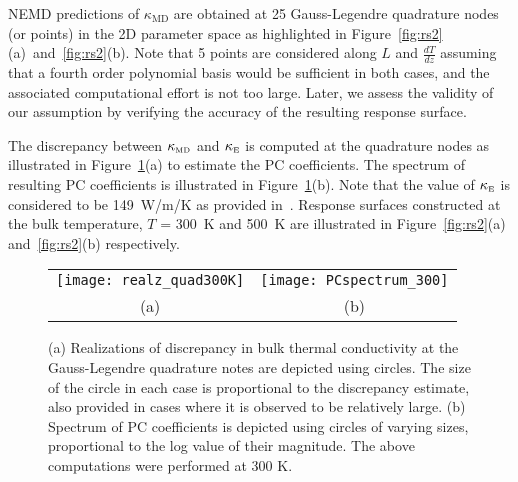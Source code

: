 NEMD predictions of $\kappa_{\text{MD}}$
are obtained at 25 Gauss-Legendre quadrature nodes (or points) in the 2D parameter 
space as highlighted in Figure~\ref{fig:rs2}(a)~and~\ref{fig:rs2}(b). 
Note that 5 points are considered along $L$ and
$\frac{dT}{dz}$ assuming that a fourth order polynomial basis would be sufficient in
both cases, and the associated computational effort is not too large. 
Later, we assess the validity of our assumption by verifying the accuracy of the resulting
response surface.
 
 The discrepancy between $\kappa_{\mbox{\tiny{MD}}}$ and $\kappa_{\mbox{\tiny{E}}}$ is computed at the quadrature nodes as illustrated in Figure~\ref{fig:rs1}(a) to estimate the PC coefficients. The spectrum of 
 resulting PC coefficients is illustrated in Figure~\ref{fig:rs1}(b). 
Note that the value of $\kappa_{\mbox{\tiny{E}}}$ is considered to be 149~W/m/K as provided 
 in~\cite{Shanks:1963}. Response surfaces constructed at the bulk temperature, $T$ = 300~K and 500~K are 
 illustrated
 in Figure~\ref{fig:rs2}(a) and~\ref{fig:rs2}(b) respectively.

\begin{figure}[htbp]
\begin{center}
\begin{tabular}{cc}
  \hspace{-12mm}
  \texttt{[image: realz\_quad300K]}
  &
  \hspace{-9mm}
  \texttt{[image: PCspectrum\_300]}
  \\ (a) & (b)
  \end{tabular}
\caption{(a) Realizations of discrepancy in bulk thermal conductivity at the Gauss-Legendre quadrature notes are
depicted using circles. The size of the circle in each case is proportional to the discrepancy estimate, also provided
 in cases where it is observed to be relatively large. (b) Spectrum of PC coefficients is depicted using circles of
 varying sizes, proportional to the log value of their magnitude. The above computations were performed at 300 K.}
\label{fig:rs1}
\end{center}
\end{figure}


